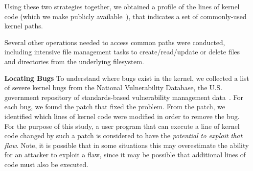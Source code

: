 Using these two strategies together, we obtained a profile of the lines of
kernel code (which we make publicly available~), that indicates
a set of commonly-used kernel paths.

Several other operations needed to access common paths were conducted, including
intensive file management tasks to create/read/update or delete files and
directories from the underlying filesystem. 


\textbf{Locating Bugs}
To understand where bugs exist in the kernel, we collected a list of
severe kernel bugs from the National Vulnerability Database, the U.S. 
government repository of standards-based vulnerability management 
data~\cite{NVD}. For each bug, we
found the patch that fixed the problem.  From the patch, we identified 
which lines of kernel code were modified in order to remove the bug.  
For the purpose of this study, a user program that can execute a line of kernel
code changed by such a patch is considered to have the \textit{potential to 
exploit that flaw}.  Note, it is possible that in some situations this may 
overestimate the ability for an attacker to exploit a flaw, since it may be 
possible that additional lines of code must also be executed.


